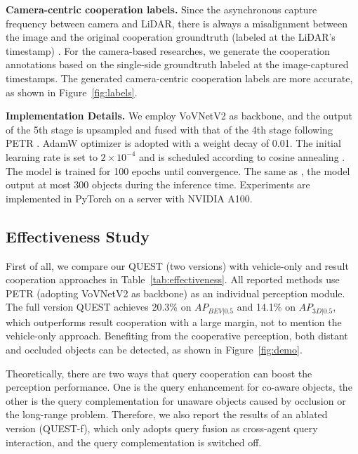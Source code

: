 \documentclass[letterpaper, 10 pt, conference]{ieeeconf}  %
\begin{document}
\textbf{Camera-centric cooperation labels.} Since the asynchronous capture frequency between camera and LiDAR, there is always a misalignment between the image and the original cooperation groundtruth (labeled at the LiDAR's timestamp) \cite{yu2022dair}. For the camera-based researches, we generate the cooperation annotations based on the single-side groundtruth labeled at the image-captured timestamps. The generated camera-centric cooperation labels are more accurate, as shown in Figure~\ref{fig:labels}.

\textbf{Implementation Details.}
We employ VoVNetV2 \cite{lee2019energy} as backbone, and the output of the 5th stage is upsampled and fused with that of the 4th stage following PETR \cite{petr}.
AdamW optimizer \cite{loshchilov2017decoupled, adam} is adopted with a weight decay of 0.01. The initial learning rate is set to $2 \times 10^{-4}$ and is scheduled according to cosine annealing \cite{loshchilov2016sgdr}. The model is trained for 100 epochs until convergence. The same as \cite{petr, detr3d, mutr}, the model output at most 300 objects during the inference time. Experiments are implemented in PyTorch on a server with NVIDIA A100.

\subsection{Effectiveness Study}

First of all, we compare our QUEST (two versions) with vehicle-only and result cooperation approaches in Table~\ref{tab:effectiveness}. All reported methods use PETR (adopting VoVNetV2 as backbone) as an individual perception module. The full version QUEST achieves 20.3\% on $AP_{BEV|0.5}$ and 14.1\% on $AP_{3D|0.5}$, which outperforms result cooperation with a large margin, not to mention the vehicle-only approach. Benefiting from the cooperative perception, both distant and occluded objects can be detected, as shown in Figure~\ref{fig:demo}.

Theoretically, there are two ways that query cooperation can boost the perception performance. One is the query enhancement for co-aware objects, the other is the query complementation for unaware objects caused by occlusion or the long-range problem. Therefore, we also report the results of an ablated version (QUEST-f), which only adopts query fusion as cross-agent query interaction, and the query complementation is switched off. 
\end{document}
